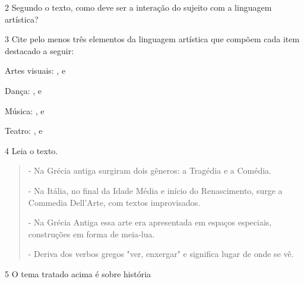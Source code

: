 \num{2} Segundo o texto, como deve ser a interação do sujeito com a linguagem artística?


\num{3}  Cite pelo menos três elementos da linguagem artística que compõem cada item destacado a seguir:

\begin{escolha}
\item
  Artes visuais: \preencher, \preencher e \preencher


\item
  Dança: \preencher, \preencher e \preencher


\item
  Música: \preencher, \preencher e \preencher


\item
  Teatro: \preencher, \preencher e \preencher

\end{escolha}

\num{4} Leia o texto.

\begin{quote}
- Na Grécia antiga surgiram dois gêneros: a Tragédia e a Comédia.

- Na Itália, no final da Idade Média e início do Renascimento, surge a
Commedia Dell'Arte, com textos improvisados.

- Na Grécia Antiga essa arte era apresentada em espaços especiais,
construções em forma de meia-lua.

- Deriva dos verbos gregos "ver, enxergar" e significa lugar de onde se vê.
\end{quote}

\num{5} O tema tratado acima é sobre história

